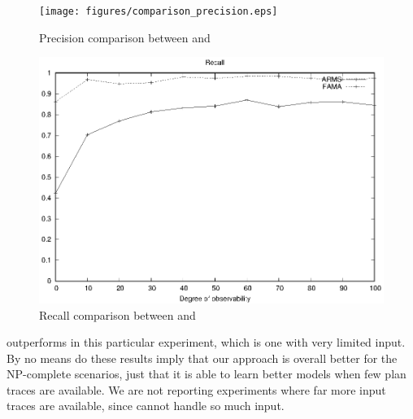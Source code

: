 \begin{figure}[hbt!]
	\centering
	\texttt{[image: figures/comparison\_precision.eps]}
	\caption{Precision comparison between \FAMA and \ARMS}
	\label{fig:comparison_precision}
\end{figure}

\begin{figure}[hbt!]
	\centering
	\includegraphics[width=.8\linewidth]{figures/comparison_recall.eps}
	\caption{Recall comparison between \FAMA and \ARMS}
	\label{fig:comparison_recall}
\end{figure}




\FAMA outperforms \ARMS in this particular experiment, which is one with very limited input. By no means do these results imply that our approach is overall better for the NP-complete scenarios, just that it is able to learn better models when few plan traces are available. We are not reporting experiments where far more input traces are available, since \FAMA cannot handle so much input.




